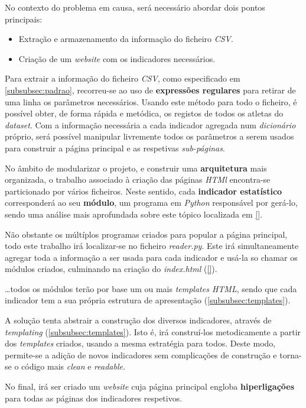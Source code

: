 No contexto do problema em causa, será necessário abordar dois pontos principais:
\begin{itemize}
    \item Extração e armazenamento da informação do ficheiro \textit{CSV}.
    \item Criação de um \textit{website} com os indicadores necessários.
\end{itemize}

Para extrair a informação do ficheiro \textit{CSV}, como especificado em \ref{subsubsec:padrao}, recorreu-se ao uso de \textbf{expressões regulares} para retirar
de uma linha os parâmetros necessários.
Usando este método para todo o ficheiro, é possível obter, de forma rápida e metódica, os registos de todos os atletas 
do \textit{dataset}.
Com a informação necessária a cada indicador agregada num \textit{dicionário} próprio, será possível manipular 
livremente todos os parâmetros a serem usados para construir a página principal e as respetivas \textit{sub-páginas}.

No âmbito de modularizar o projeto, e construir uma \textbf{arquitetura} mais organizada, o trabalho associado à criação das páginas \textit{HTMl} encontra-se 
particionado por vários ficheiros. 
Neste sentido, cada \textbf{indicador estatístico} corresponderá ao seu \textbf{módulo}, um programa em \textit{Python} responsável por gerá-lo, sendo uma análise mais aprofundada
sobre este tópico localizada em \ref{}.

Não obstante os múltíplos programas criados para popular a página principal, todo este trabalho irá localizar-se no ficheiro \textit{reader.py}. 
Este irá simultaneamente agregar toda a informação a ser usada para cada indicador e usá-la so chamar os módulos criados, culminando na criação do 
\textit{index.html} (\ref{}). 

\dots todos os módulos terão por base um ou mais \textit{templates HTML}, sendo que cada indicador tem a sua própria estrutura de apresentação (\ref{subsubsec:templates}).

A solução tenta abstrair a construção dos diversos indicadores, através de \textit{templating} (\ref{subsubsec:templates}).
Isto é, irá construí-los metodicamente a partir dos \textit{templates} criados, usando a mesma estratégia para todos.
Deste modo, permite-se a adição de novos indicadores sem complicações de construção e torna-se o código mais \textit{clean} e \textit{readable}.

No final, irá ser criado um \textit{website} cuja página principal engloba \textbf{hiperligações} para todas as páginas dos indicadores respetivos.